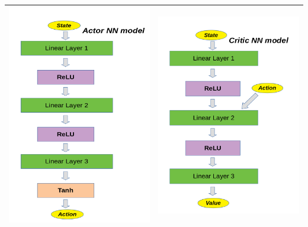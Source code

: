 \documentclass[a4paper]{article}
\begin{document}
\begin{tabular}{ |c|c| }
  \hline
  \includegraphics[scale=0.3]{ActorPic.png} & \includegraphics[scale=0.3]{CriticPic.png} \\
  \hline
\end{tabular}
\end{document}
